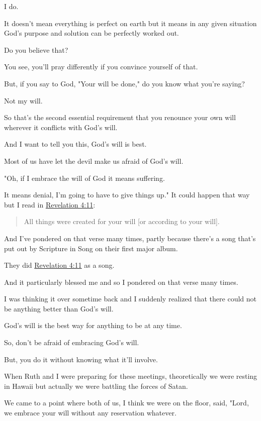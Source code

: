 \documentclass[11pt]{article}
\begin{document}
I do.

It doesn't mean everything is perfect on earth
but it means in any given situation God's
purpose and solution can be perfectly worked
out.

Do you believe that?

You see, you'll pray differently if you
convince yourself of that.

But, if you say to God, "Your will be done,"
do you know what you're saying?

Not my will.

So that's the second essential requirement
that you renounce your own will wherever it
conflicts with God's will.

And I want to tell you this, God's will is
best.

Most of us have let the devil make us afraid
of God's will.

"Oh, if I embrace the will of God it means
suffering.

It means denial, I'm going to have to give
things up." It could happen that way but I
read in \href{https://www.biblegateway.com/passage/?search=Revelation\%204\%3A11\&version=ESV}{Revelation 4:11}:

\begin{quote}
All things were created for your will [or according to your will].
\end{quote}

And I've pondered on that verse many times,
partly because there's a song that's put out
by Scripture in Song on their first major
album.

They did \href{https://www.biblegateway.com/passage/?search=Revelation\%204\%3A11\&version=ESV}{Revelation 4:11} as a song.

And it particularly blessed me and so I
pondered on that verse many times.

I was thinking it over sometime back and I
suddenly realized that there could not be
anything better than God's will.

God's will is the best way for anything to be
at any time.

So, don't be afraid of embracing God's will.

But, you do it without knowing what it'll
involve.

When Ruth and I were preparing for these
meetings, theoretically we were resting in
Hawaii but actually we were battling the
forces of Satan.

We came to a point where both of us, I think
we were on the floor, said, "Lord, we embrace
your will without any reservation whatever.
\end{document}
